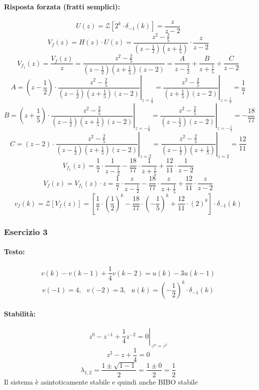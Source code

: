 \documentclass[a4paper]{article}
\begin{document}
	\paragraph{Risposta forzata (fratti semplici):}
	\[ U(z) = \mathcal{Z} \left[ 2^k \cdot \delta_{-1}(k) \right] = \frac{z}{z-2} \]
	\[ V_f(z) = H(z) \cdot U(z) = \frac{z^2 - \frac{2}{5}}{(z - \frac{1}{2})(z + \frac{1}{5})} \cdot \frac{z}{z-2} \]
	\[ V_{f_1}(z) = \frac{V_f(z)}{z} = \frac{z^2 - \frac{2}{5}}{(z - \frac{1}{2})(z + \frac{1}{5})(z-2)} = \frac{A}{z - \frac{1}{2}} + \frac{B}{z + \frac{1}{5}} + \frac{C}{z-2} \]
	\[
	A = \left. \left( z - \frac{1}{2} \right) \cdot \frac{z^2 - \frac{2}{5}}{(z - \frac{1}{2})(z + \frac{1}{5})(z-2)} \right|_{z = \frac{1}{2}} = \left. \frac{z^2 - \frac{2}{5}}{(z + \frac{1}{5})(z-2)} \right|_{z = \frac{1}{2}} = \frac{1}{7}
	\]
	\[
	B = \left. \left( z + \frac{1}{5} \right) \cdot \frac{z^2 - \frac{2}{5}}{(z - \frac{1}{2})(z + \frac{1}{5})(z-2)} \right|_{z = - \frac{1}{5}} = \left. \frac{z^2 - \frac{2}{5}}{(z - \frac{1}{2})(z-2)} \right|_{z = - \frac{1}{5}} = - \frac{18}{77}
	\]
	\[
	C = \left. \left( z - 2 \right) \cdot \frac{z^2 - \frac{2}{5}}{(z - \frac{1}{2})(z + \frac{1}{5})(z-2)} \right|_{z = 2} = \left. \frac{z^2 - \frac{2}{5}}{(z - \frac{1}{2})(z + \frac{1}{5})} \right|_{z = 2} = \frac{12}{11}
	\]
	\[ V_{f_1}(z) = \frac{1}{7} \cdot \frac{1}{z - \frac{1}{2}} - \frac{18}{77} \cdot \frac{1}{z + \frac{1}{5}} + \frac{12}{11} \cdot \frac{1}{z-2} \]
	\[ V_f(z) = V_{f_1}(z) \cdot z = \frac{1}{7} \cdot \frac{z}{z - \frac{1}{2}} - \frac{18}{77} \cdot \frac{z}{z + \frac{1}{5}} + \frac{12}{11} \cdot \frac{z}{z-2} \]
	\[
	v_f(k) = \mathcal{Z} [V_f(z)] = \left[ \frac{1}{7} \cdot \left( \frac{1}{2} \right)^k - \frac{18}{77} \cdot \left( - \frac{1}{5} \right)^k + \frac{12}{11} \cdot \left( 2 \right)^k \right] \cdot \delta_{-1}(k)
	\]
	
	
	\subsubsection{Esercizio 3}
	\paragraph{Testo:}
	\[ v(k) - v(k-1) + \frac{1}{4} v(k-2) = u(k) - 3 u(k-1) \]
	\[ v(-1) = 4, \text{ } v(-2) = 3, \text{ } u(k) = \left( -\frac{1}{2} \right)^k \cdot \delta_{-1}(k) \]
	
	\paragraph{Stabilità:}
	\[ \left. z^0 - z^{-1} + \frac{1}{4} z^{-2} = 0 \right|_{\cdot z^n = z^2} \]
	\[ z^2 - z + \frac{1}{4} = 0 \]
	\[ \lambda_{1,2} = \frac{1 \pm \sqrt{1-1}}{2} = \frac{1 \pm 0}{2} = \frac{1}{2} \]
	Il sistema è asintoticamente stabile e quindi anche BIBO stabile
	
\end{document}
